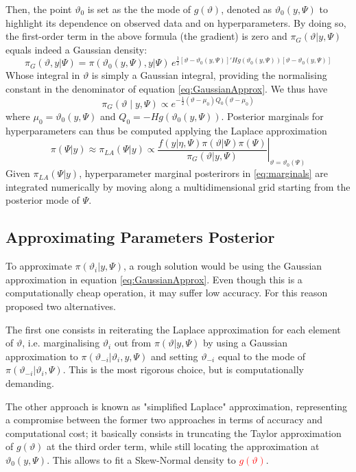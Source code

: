 \documentclass[openany]{book}
\begin{document}
Then, the point $\vartheta_0$ is set as the the mode of $g(\vartheta)$,  denoted as $\vartheta_0(y, \Psi)$ to highlight its dependence on observed data and on hyperparameters. By doing so, the first-order term in the above formula (the gradient) is zero and $\pi_G(\vartheta | y, \Psi) $ equals indeed a Gaussian density:
$$
\pi_{G}(\vartheta, y | \Psi) =  \pi(\vartheta_0(y, \Psi), y | \Psi) \, e^{\displaystyle{
\tfrac{1}{2}[\vartheta - \vartheta_0(y, \Psi)]'
H g(\vartheta_0(y, \Psi))
[\vartheta - \vartheta_0(y, \Psi)]
}}
$$
Whose integral in $\vartheta$ is simply a Gaussian integral, providing the normalising constant in the denominator of equation \ref{eq:GaussianApprox}. We thus have
\begin{equation}
\pi_G(\vartheta \mid y, \Psi) \propto e^{\displaystyle - \frac{1}{2}
(\vartheta - \mu_0)Q_0(\vartheta - \mu_0)
}
\label{eq:apprG}
\end{equation}
where $\mu_0 = \vartheta_0(y, \Psi)$ and $Q_0 = -H g(\vartheta_0(y, \Psi))$. 
Posterior marginals for hyperparameters can thus be computed applying the Laplace approximation
$$
\pi(\Psi |y) \approx \pi_{LA}(\Psi | y) \propto  \left. \frac{f(y | \eta, \Psi) \pi(\vartheta | \Psi) \pi(\Psi)}{\pi_G(\vartheta | y, \Psi)} 
\right \vert_{\vartheta = \vartheta_0(\Psi)}
$$
Given $\pi_{LA} (\Psi | y)$, hyperparameter marginal posterirors in \ref{eq:marginals} are integrated numerically by moving along a multidimensional grid starting from the posterior mode of $\Psi$. 

\subsection{Approximating Parameters Posterior}\label{par:inla_theta}
To approximate $\pi(\vartheta_i|y, \Psi)$, a rough solution would be using the Gaussian approximation in equation \ref{eq:GaussianApprox}. Even though this is a computationally cheap operation, it may suffer low accuracy. For this reason \cite{INLA} proposed two alternatives. 

The first one consists in reiterating the Laplace approximation for each element of $\vartheta$, i.e. marginalising $\vartheta_i$ out from $\pi(\vartheta | y, \Psi)$ by using a Gaussian approximation to $\pi(\vartheta_{-i} | \vartheta_i, y, \Psi)$ and setting $\vartheta_{-i}$ equal to the mode of $\pi(\vartheta_{-i}|\vartheta_i, \Psi)$. This is the most rigorous choice, but is computationally demanding.

The other approach is known as "simplified Laplace" approximation, representing a compromise between the former two approaches in terms of accuracy and computational cost; it basically consists in truncating the Taylor approximation of $g(\vartheta)$ at the third order term, while still locating the approximation at $\vartheta_0(y, \Psi)$. This allows to fit a Skew-Normal density to \textcolor{red}{$g(\vartheta)$}.
\end{document}
